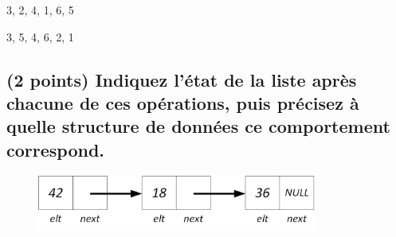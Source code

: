 \documentclass[11pt,a4paper]{article}
\begin{document}
\medskip


\begin{center}

\begin{large}
3, 2, 4, 1, 6, 5
\end{large}

\begin{center}
\end{center}


\begin{large}
3, 5, 4, 6, 2, 1
\end{large}

\begin{center}
\end{center}

\end{center}

\vfillLast

\newpage

\subsection{(2 points) Indiquez l'état de la liste après chacune de ces opérations, puis précisez à quelle structure de données ce comportement correspond. }


\begin{figure}[ht!]
\centering
\centerline{  %
\includegraphics[height=1.85cm]{img/Liste_p_1.png}
}
\end{figure}
\end{document}
